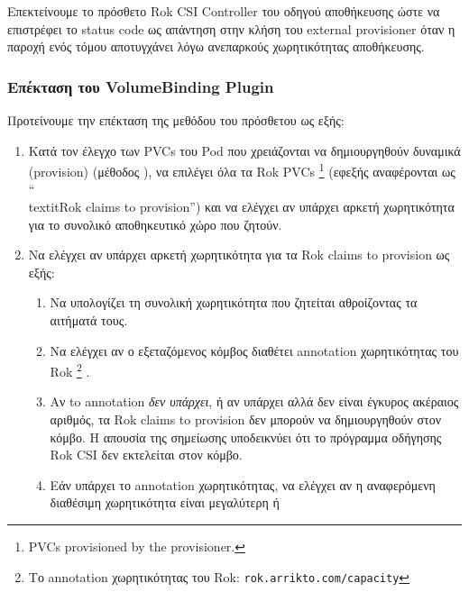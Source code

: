 Επεκτείνουμε το πρόσθετο Rok CSI Controller του οδηγού αποθήκευσης ώστε να
επιστρέφει το status  code  ως απάντηση στην κλήση
 του external provisioner όταν η παροχή ενός τόμου αποτυγχάνει
λόγω ανεπαρκούς χωρητικότητας αποθήκευσης.

\subsubsection{Επέκταση του VolumeBinding Plugin}
\label{section:gr-volume-plugin-extensions}

Προτείνουμε την επέκταση της  μεθόδου του πρόσθετου
 ως εξής:
\begin{enumerate}
      \tightlist
      \item Κατά τον έλεγχο των PVCs του Pod που χρειάζονται να δημιουργηθούν
            δυναμικά (provision) (μέθοδος ), να
            επιλέγει όλα τα Rok PVCs
            \footnote{PVCs provisioned by the 
                  provisioner.} (εφεξής αναφέρονται ως ``\\textit{Rok claims to
                  provision}'') και να ελέγχει αν υπάρχει αρκετή χωρητικότητα
                  για το συνολικό αποθηκευτικό χώρο που ζητούν.
      \item Να ελέγχει αν υπάρχει αρκετή χωρητικότητα για τα Rok claims to
            provision ως εξής:
            \begin{enumerate}
                  \tightlist
                  \item Να υπολογίζει τη συνολική χωρητικότητα που ζητείται
                        αθροίζοντας τα αιτήματά τους.
                  \item Να ελέγχει  αν ο εξεταζόμενος κόμβος διαθέτει annotation
                        χωρητικότητας του Rok \footnote{Το annotation
                        χωρητικότητας του Rok:
                        \texttt{rok.arrikto.com/capacity}} .
                  \item Αν to annotation \textit{δεν υπάρχει}, ή αν υπάρχει αλλά
                        δεν είναι έγκυρος ακέραιος αριθμός, τα Rok claims to
                        provision δεν μπορούν να δημιουργηθούν στον κόμβο. Η
                        απουσία της σημείωσης υποδεικνύει ότι το πρόγραμμα
                        οδήγησης Rok CSI δεν εκτελείται στον κόμβο.
                  \item Εάν υπάρχει το annotation χωρητικότητας, να ελέγχει αν η
                        αναφερόμενη διαθέσιμη χωρητικότητα είναι μεγαλύτερη ή

\end{enumerate}
\end{enumerate}
